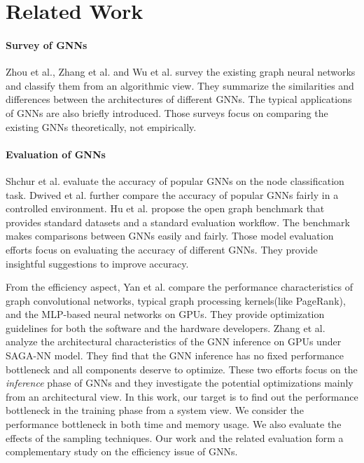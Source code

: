 \section{Related Work}
\label{sec:related_work}

\paragraph{Survey of GNNs}
Zhou et al.\cite{zhou2018_gnn_review}, Zhang et al.\cite{zhang2018_gnn_survey} and Wu et al.\cite{comprehensive-survey-wu-2020} survey the existing graph neural networks and classify them from an algorithmic view.
They summarize the similarities and differences between the architectures of different GNNs.
The typical applications of GNNs are also briefly introduced.
Those surveys focus on comparing the existing GNNs theoretically, not empirically.

\paragraph{Evaluation of GNNs}
Shchur et al. \cite{shchur2018_pitfall_of_gnn} evaluate the accuracy of popular GNNs on the node classification task.
Dwived et al. \cite{dwivedi2020_benchmark_of_gnn} further compare the accuracy of popular GNNs fairly in a controlled environment.
Hu et al. \cite{hu2020_open_graph_benchmark} propose the open graph benchmark that provides standard datasets and a standard evaluation workflow.
The benchmark makes comparisons between GNNs easily and fairly.
Those model evaluation efforts focus on evaluating the accuracy of different GNNs.
They provide insightful suggestions to improve accuracy.

From the efficiency aspect, Yan et al. \cite{yan2020_characterizing_gcn} compare the performance characteristics of graph convolutional networks, typical graph processing kernels(like PageRank), and the MLP-based neural networks on GPUs.
They provide optimization guidelines for both the software and the hardware developers.
Zhang et al. \cite{zhang2020_analysis_neugraph} analyze the architectural characteristics of the GNN inference on GPUs under SAGA-NN \cite{ma2019_neugraph} model.
They find that the GNN inference has no fixed performance bottleneck and all components deserve to optimize.
These two efforts focus on the \emph{inference} phase of GNNs and they investigate the potential optimizations mainly from an architectural view.
In this work, our target is to find out the performance bottleneck in the training phase from a system view.
We consider the performance bottleneck in both time and memory usage.
We also evaluate the effects of the sampling techniques.
Our work and the related evaluation\cite{yan2020_characterizing_gcn, zhang2020_analysis_neugraph} form a complementary study on the efficiency issue of GNNs.

